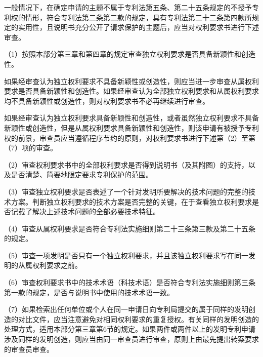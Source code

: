 一般情况下，在确定申请的主题不属于专利法第五条、第二十五条规定的不授予专利权的情形，符合专利法第二条第二款的规定，具有专利法第二十二条第四款所规定的实用性，且说明书充分公开了请求保护的主题后，应当对权利要求书进行下述审查。

{\setlength{\parindent}{17.1bp}（1）按照本部分第三章和第四章的规定审查独立权利要求是否具备新颖性和创造性。\par}

如果经审查认为独立权利要求不具备新颖性或创造性，则应当进一步审查从属权利要求是否具备新颖性和创造性。如果经审查认为全部独立权利要求和从属权利要求均不具备新颖性或创造性，则对权利要求书不必再继续进行审查。

如果经审查认为独立权利要求具备新颖性和创造性，或者虽然独立权利要求不具备新颖性或创造性，但是从属权利要求具备新颖性和创造性，则该申请有被授予专利权的前景，审查员应当遵循程序节约的原则，对权利要求书进行下述第（2）至第（7）项的审查。

{\setlength{\parindent}{17.1bp}（2）审查权利要求书中的全部权利要求是否得到说明书（及其附图）的支持，以及是否清楚、简要地限定要求专利保护的范围。\par}

{\setlength{\parindent}{17.1bp}（3）审查独立权利要求是否表述了一个针对发明所要解决的技术问题的完整的技术方案。判断独立权利要求的技术方案是否完整的关键，在于查看独立权利要求是否记载了解决上述技术问题的全部必要技术特征。\par}

{\setlength{\parindent}{17.1bp}（4）审查从属权利要求是否符合专利法实施细则第二十三条第三款及第二十五条的规定。\par}

{\setlength{\parindent}{17.1bp}（5）审查一项发明是否只有一个独立权利要求，并且该独立权利要求写在同一发明的从属权利要求之前。\par}

{\setlength{\parindent}{17.1bp}（6）审查权利要求书中的技术术语（科技术语）是否符合专利法实施细则第三条第一款的规定，是否与说明书中使用的技术术语一致。\par}

{\setlength{\parindent}{17.1bp}（7）如果检索出任何单位或个人在同一申请日向专利局提交的属于同样的发明创造的对比文件，应当注意避免对相同权利要求的重复授权。有关同样的发明创造的处理方式，适用本部分第三章第6节的规定。如果两件或两件以上的发明专利申请涉及同样的发明创造，则应当由同一审查员进行审查，原则上由最先提出转案要求的审查员审查。\par}

